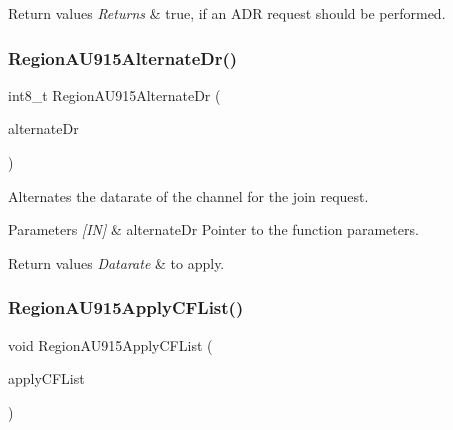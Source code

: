 \begin{DoxyRetVals}{Return values}
{\em Returns} & true, if an A\+DR request should be performed. \\
\hline
\end{DoxyRetVals}
\mbox{\label{group__REGIONAU915_ga968233f3d01f5aa9f91fff2c20955616}} 
\subsubsection{\texorpdfstring{Region\+A\+U915\+Alternate\+Dr()}{RegionAU915AlternateDr()}}
{\footnotesize\ttfamily int8\+\_\+t Region\+A\+U915\+Alternate\+Dr (\begin{DoxyParamCaption}\item[{\hyperlink{group__REGION_ga001ea4338d1c83f4c785b49d7ad2d696}{Alternate\+Dr\+Params\+\_\+t} $\ast$}]{alternate\+Dr }\end{DoxyParamCaption})}



Alternates the datarate of the channel for the join request. 


\begin{DoxyParams}{Parameters}
{\em \mbox{[}\+I\+N\mbox{]}} & alternate\+Dr Pointer to the function parameters.\\
\hline
\end{DoxyParams}

\begin{DoxyRetVals}{Return values}
{\em Datarate} & to apply. \\
\hline
\end{DoxyRetVals}
\mbox{\label{group__REGIONAU915_ga4fd62616137cb73c9fc38f0854e6dad9}} 
\subsubsection{\texorpdfstring{Region\+A\+U915\+Apply\+C\+F\+List()}{RegionAU915ApplyCFList()}}
{\footnotesize\ttfamily void Region\+A\+U915\+Apply\+C\+F\+List (\begin{DoxyParamCaption}\item[{\hyperlink{group__REGION_ga71588e9ad07e34b78fa91d51881fd3c6}{Apply\+C\+F\+List\+Params\+\_\+t} $\ast$}]{apply\+C\+F\+List }\end{DoxyParamCaption})}



